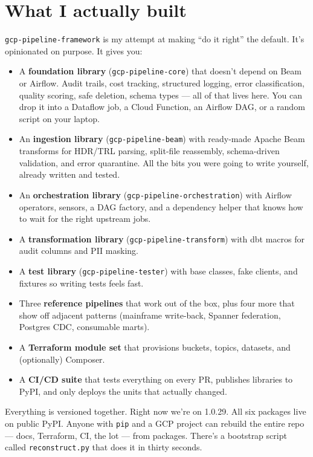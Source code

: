 \documentclass[
  11pt,
  british,
  oneside]{book}
\providecommand{\tightlist}{%
  \setlength{\itemsep}{0pt}\setlength{\parskip}{0pt}}
\begin{document}
\hypertarget{what-i-actually-built}{%
\section{What I actually built}\label{what-i-actually-built}}

\texttt{gcp-pipeline-framework} is my attempt at making ``do it right''
the default. It's opinionated on purpose. It gives you:

\begin{itemize}
\tightlist
\item
  A \textbf{foundation library} (\texttt{gcp-pipeline-core}) that
  doesn't depend on Beam or Airflow. Audit trails, cost tracking,
  structured logging, error classification, quality scoring, safe
  deletion, schema types --- all of that lives here. You can drop it
  into a Dataflow job, a Cloud Function, an Airflow DAG, or a random
  script on your laptop.
\item
  An \textbf{ingestion library} (\texttt{gcp-pipeline-beam}) with
  ready-made Apache Beam transforms for HDR/TRL parsing, split-file
  reassembly, schema-driven validation, and error quarantine. All the
  bits you were going to write yourself, already written and tested.
\item
  An \textbf{orchestration library}
  (\texttt{gcp-pipeline-orchestration}) with Airflow operators, sensors,
  a DAG factory, and a dependency helper that knows how to wait for the
  right upstream jobs.
\item
  A \textbf{transformation library} (\texttt{gcp-pipeline-transform})
  with dbt macros for audit columns and PII masking.
\item
  A \textbf{test library} (\texttt{gcp-pipeline-tester}) with base
  classes, fake clients, and fixtures so writing tests feels fast.
\item
  Three \textbf{reference pipelines} that work out of the box, plus four
  more that show off adjacent patterns (mainframe write-back, Spanner
  federation, Postgres CDC, consumable marts).
\item
  A \textbf{Terraform module set} that provisions buckets, topics,
  datasets, and (optionally) Composer.
\item
  A \textbf{CI/CD suite} that tests everything on every PR, publishes
  libraries to PyPI, and only deploys the units that actually changed.
\end{itemize}

Everything is versioned together. Right now we're on 1.0.29. All six
packages live on public PyPI. Anyone with \texttt{pip} and a GCP project
can rebuild the entire repo --- docs, Terraform, CI, the lot --- from
packages. There's a bootstrap script called \texttt{reconstruct.py} that
does it in thirty seconds.
\end{document}
